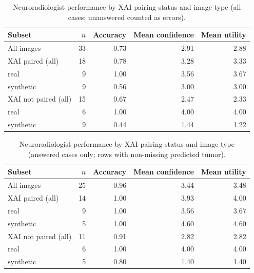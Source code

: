 \begin{table}[H]
\centering
\caption{Neuroradiologist performance by XAI pairing status and image type (all cases; unanswered counted as errors).}
\label{tab:hitl_xai_all_cases}
\begin{tabular}{lrrrr}
\toprule
Subset & $n$ & Accuracy & Mean confidence & Mean utility \\
\midrule
All images                 & 33 & 0.73 & 2.91 & 2.88 \\
\midrule
XAI paired (all)           & 18 & 0.78 & 3.28 & 3.33 \\
\quad real                 &  9 & 1.00 & 3.56 & 3.67 \\
\quad synthetic            &  9 & 0.56 & 3.00 & 3.00 \\
\midrule
XAI not paired (all)       & 15 & 0.67 & 2.47 & 2.33 \\
\quad real                 &  6 & 1.00 & 4.00 & 4.00 \\
\quad synthetic            &  9 & 0.44 & 1.44 & 1.22 \\
\bottomrule
\end{tabular}
\end{table}


\begin{table}[H]
\centering
\caption{Neuroradiologist performance by XAI pairing status and image type (answered cases only; rows with non-missing predicted tumor).}
\label{tab:hitl_xai_answered_only}
\begin{tabular}{lrrrr}
\toprule
Subset & $n$ & Accuracy & Mean confidence & Mean utility \\
\midrule
All images                 & 25 & 0.96 & 3.44 & 3.48 \\
\midrule
XAI paired (all)           & 14 & 1.00 & 3.93 & 4.00 \\
\quad real                 &  9 & 1.00 & 3.56 & 3.67 \\
\quad synthetic            &  5 & 1.00 & 4.60 & 4.60 \\
\midrule
XAI not paired (all)       & 11 & 0.91 & 2.82 & 2.82 \\
\quad real                 &  6 & 1.00 & 4.00 & 4.00 \\
\quad synthetic            &  5 & 0.80 & 1.40 & 1.40 \\
\bottomrule
\end{tabular}
\end{table}

